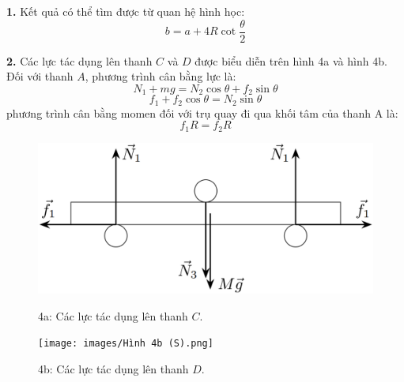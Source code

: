 \noindent\textbf{1.} Kết quả có thể tìm được từ quan hệ hình học:
\begin{equation}
  \label{eq:41}
  b=a+4R\cot\frac{\theta}{2}
\end{equation}

\noindent\textbf{2.} Các lực tác dụng lên thanh $C$ và $D$ được biểu diễn trên hình 4a và hình 4b. Đối với thanh $A$, phương trình cân bằng lực là:
\begin{equation}
  \label{eq:42}
  N_{1}+mg=N_{2}\cos\theta+f_{2}\sin\theta
\end{equation}
\begin{equation}
  \label{eq:43}
  f_{1}+f_{2}\cos\theta=N_{2}\sin\theta
\end{equation}
phương trình cân bằng momen đối với trụ quay đi qua khối tâm của thanh A là:
\begin{equation}
  \label{eq:44}
  f_{1}R=f_{2}R
\end{equation}
\begin{figure}[h]
  \centering
  \begin{minipage}{6cm}
    \centering
    \includegraphics[width=1.4\textwidth]{images/Hinh 4a (S).png}
    \begin{center}
      \figurename{ 4a: Các lực tác dụng lên thanh $C$.}
    \end{center}
  \end{minipage}
  \hfil
  \begin{minipage}{6cm}
    \centering
    \texttt{[image: images/Hình 4b (S).png]}
    \begin{center}
      \figurename{ 4b: Các lực tác dụng lên thanh $D$.}
    \end{center}
  \end{minipage}
\end{figure}

